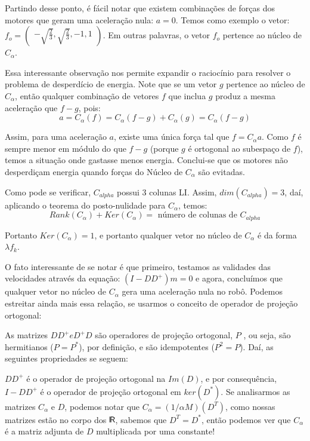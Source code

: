 \documentclass{article}
\def\bkRsf{{\sf \mbox{\vrule height0.705em width0.06em
            depth0em}\kern-.04em R}}
\begin{document}
Partindo desse ponto, é fácil notar que existem combinações de forças dos motores que geram uma aceleração nula: $ a = 0 $. Temos como exemplo o vetor: $f_{o} = \begin{pmatrix} -\sqrt{\frac{2}{3}},\sqrt{\frac{2}{3}},-1,1\end{pmatrix}$. Em outras palavras, o vetor $f_{o}$ pertence ao núcleo de $C_{\alpha}$.

Essa interessante observação nos permite expandir o raciocínio para resolver o problema de desperdício de energia. Note que se um vetor $g$ pertence ao núcleo de $C_{\alpha}$, então qualquer combinação de vetores $f$ que inclua $g$ produz a mesma aceleração que $f - g$, pois:
\[ a = C_{\alpha}(f) = C_{\alpha}(f-g) + C_{\alpha}(g) = C_{\alpha}(f-g)\]

Assim, para uma aceleração $a$, existe uma única força tal que $f=C_{\alpha}a$. Como $f$ é sempre menor em módulo do que $f-g$ (porque $g$ é ortogonal ao subespaço de $f$), temos a situação onde gastasse menos energia. Conclui-se que os motores não desperdiçam energia quando forças do Núcleo de $C_{\alpha}$ são evitadas.

Como pode se verificar, $C_{alpha}$ possui 3 colunas LI. Assim, $dim(C_{alpha}) = 3$, daí, aplicando o teorema do posto-nulidade para $C_{\alpha}$, temos:
\[Rank(C_{\alpha}) + Ker(C_{\alpha}) = \text{ número de colunas de }C_{alpha}\]


Portanto $Ker(C_{\alpha}) = 1 $, e portanto qualquer vetor no núcleo de $C_{\alpha}$ é da forma $\lambda f_{k}$.

O fato interessante de se notar é que primeiro, testamos as validades das velocidades através da equação: $(I-DD^+)m = 0$ e agora, concluímos que qualquer vetor no núcleo de $C_{\alpha}$ gera uma aceleração nula no robô. Podemos estreitar ainda mais essa relação, se usarmos o conceito de operador de projeção ortogonal:

As matrizes $DD^+ e D^+D$ são operadores de projeção ortogonal, $P$ , ou seja, são hermitianos ($P = P^*$), por definição, e são idempotentes ($P^2 = P$). Daí, as seguintes propriedades se seguem:

$DD^+$ é o operador de projeção ortogonal na $Im(D)$, e por consequência, $I - DD^+$ é o operador de projeção ortogonal em $ker(D^*)$.
Se analisarmos as matrizes $C_{\alpha}$ e $D$, podemos notar que $C_{\alpha} = (1/{\alpha}M)(D^T)$, como nossas matrizes estão no corpo dos $\bkRsf$, sabemos que $D^T = D^*$, então podemos ver que $C_{\alpha}$ é a matriz adjunta de $D$ multiplicada por uma constante!
\end{document}
